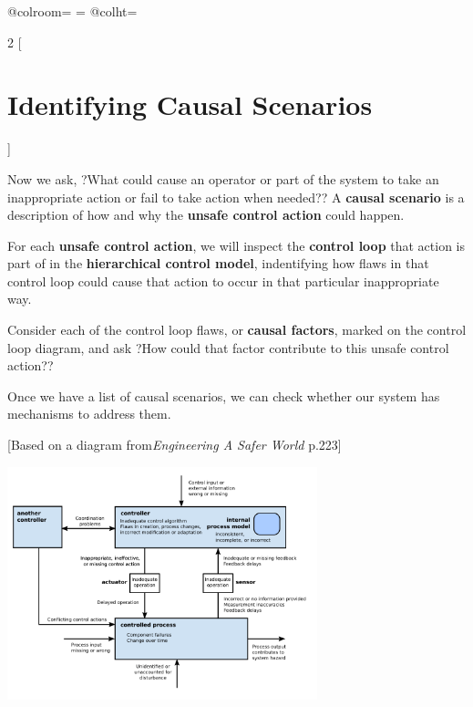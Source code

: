 \documentclass[letterpaper]{tufte-book}
\begin{document}
\begin{landscape}
\advance{}
\csname @colroom\endcsname=\vsize
\textheight=\vsize
\csname @colht\endcsname=\vsize

\setlength{\parindent}{0em}
\setlength{\parskip}{.75em}

\begin{multicols}{2}
[ \section{Identifying Causal Scenarios}]


Now we ask, ?What could cause an operator or part of the system to take an inappropriate action or fail to take action when needed?? A \textbf{causal scenario} is a description of how and why the \textbf{unsafe control action} could happen.

For each \textbf{unsafe control action}, we will inspect the \textbf{control loop} that action is part of in the \textbf{hierarchical control model}, indentifying how flaws in that control loop could cause that action to occur in that particular inappropriate way.

Consider each of the control loop flaws, or \textbf{causal factors}, marked on the control loop diagram, and ask ?How could that factor contribute to this unsafe control action?? 

Once we have a list of causal scenarios, we can check whether our system has mechanisms to address them.


[Based on a diagram from\emph{Engineering A Safer World} p.223]
\begin{center}
\includegraphics[width=9cm]{generic_control_loop-flaws}
\end{center}


\end{multicols}
\end{landscape}
\end{document}

